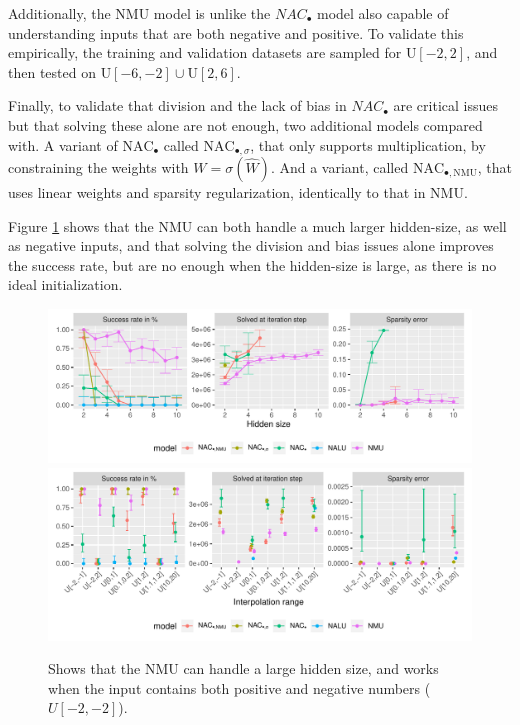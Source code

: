 Additionally, the NMU model is unlike the $NAC_{\bullet}$ model also capable of understanding inputs that are both negative and positive. To validate this empirically, the training and validation datasets are sampled for $\mathrm{U}[-2,2]$, and then tested on $\mathrm{U}[-6,-2] \cup \mathrm{U}[2,6]$.

Finally, to validate that division and the lack of bias in $NAC_{\bullet}$ are critical issues but that solving these alone are not enough, two additional models compared with. A variant of $\mathrm{NAC}_{\bullet}$ called $\mathrm{NAC}_{\bullet, \sigma}$, that only supports multiplication, by constraining the weights with $W = \sigma(\hat{W})$. And a variant, called $\mathrm{NAC}_{\bullet, \mathrm{NMU}}$, that uses linear weights and sparsity regularization, identically to that in NMU.

Figure \ref{fig:simple-function-static-theoreical-claims-experiment} shows that the NMU can both handle a much larger hidden-size, as well as negative inputs, and that solving the division and bias issues alone improves the success rate, but are no enough when the hidden-size is large, as there is no ideal initialization.

\begin{figure}[h]
\centering
\includegraphics[width=\linewidth,trim={0 1.3cm 0 0},clip]{results/simple_function_static_mul_hidden_size_short.pdf}
\includegraphics[width=\linewidth,trim={0 0.5cm 0 0.809cm},clip]{results/simple_function_static_mul_range.pdf}
\caption{Shows that the NMU can handle a large hidden size, and works when the input contains both positive and negative numbers ($U[-2,-2]$).} 
\label{fig:simple-function-static-theoreical-claims-experiment}
\end{figure}


